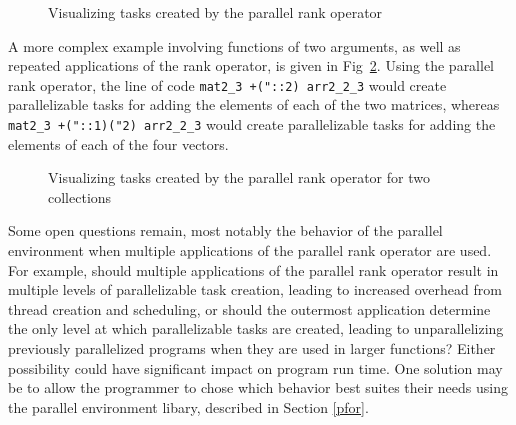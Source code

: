 \pagebreak

\begin{figure}[h]
\begin{quote}
\begin{singlespacing}
\begin{small}
\end{small}
\end{singlespacing}
\end{quote}
\caption{Visualizing tasks created by the parallel rank operator}
\label{fig::pr_tasks}
\end{figure}

A more complex example involving functions of two arguments, 
as well as repeated applications of the rank operator, is given in Fig~\ref{fig::pr_tasks2}.
Using the parallel rank operator, the line of code
\texttt{mat2\_3 +("::2) arr2\_2\_3} would create parallelizable tasks for adding the elements of each of the two matrices, whereas 
\texttt{mat2\_3 +("::1)("2) arr2\_2\_3} would create parallelizable tasks for adding the elements of each of the four vectors.

\begin{figure}[p]
\begin{quote}
\begin{singlespacing}
\begin{small}
\end{small}
\end{singlespacing}
\end{quote}
\caption{Visualizing tasks created by the parallel rank operator for two collections}
\label{fig::pr_tasks2}
\end{figure}

Some open questions remain, most notably 
the behavior of the parallel environment when multiple applications of the parallel rank operator are used. 
For example, should multiple applications of the parallel rank operator result in multiple levels of parallelizable task creation, 
leading to increased overhead from thread creation and scheduling, 
or should the outermost application determine the only level at which parallelizable tasks are created, 
leading to unparallelizing previously parallelized programs when they are used in larger functions? 
Either possibility could have significant impact on program run time.
One solution may be to allow the programmer to chose which behavior best suites their needs 
using the parallel environment libary, described in Section \ref{pfor}.

